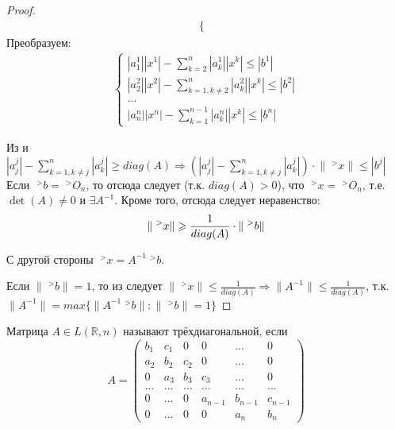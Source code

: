 \documentclass[__main__.tex]{subfiles}
\begin{document}
\begin{proof}
\begin{gather*}
\begin{cases}
        \end{cases}
    \end{gather*}
    Преобразуем:
    \begin{gather*}
        \begin{cases}
            |a^1_1| |x^1| - \sum_{k=2}^{n} |a^1_k| |x^k| \leqslant |b^1|          \\
            |a^2_2| |x^2| - \sum_{k=1,k \neq 2}^{n} |a^2_k| |x^k| \leqslant |b^2| \\
            ...                                                                   \\
            |a^n_n| |x^n| - \sum_{k=1}^{n-1} |a^n_k| |x^k| \leqslant |b^n|
        \end{cases}
    \end{gather*}

    Из  и $|a^j_j| - \sum_{k=1,k\neq j}^{n} |a^j_k| \geqslant diag(A) \Rightarrow (|a^j_j| - \sum_{k=1,k \neq j}^{n} |a^j_k|) \cdot \lVert \;^{>}x \rVert \leqslant |b^j|$
    Если $\;^{>}b = \;^{>}O_n$, то отсюда следует (т.к. $diag(A)>0$), что $\;^{>}x = \;^{>}O_n$, т.е. $\det(A) \neq 0$ и $\exists A^{-1}$. Кроме того, отсюда следует неравенство:
    \begin{equation}
        \llabel{2_4}
        \lVert \;^{>}x \rVert \geqslant \frac{1}{diag(A)} \cdot \lVert \;^{>}b \rVert
    \end{equation}

    С другой стороны $\;^{>}x = A^{-1} \;^{>}b$.

    Если $\lVert \;^{>}b \rVert = 1$, то из  следует $\lVert \;^{>}x \rVert \leqslant \frac{1}{diag(A)} \Rightarrow \lVert A^{-1} \rVert \leqslant \frac{1}{diag(A)}$, т.к. $\lVert A^{-1} \rVert = max \lbrace \lVert A^{-1} \;^{>}b \rVert : \lVert \;^{>}b \rVert = 1 \rbrace$
\end{proof}

\begin{definition}
    Матрица $A \in L (\mathbb{R},n)$ называют трёхдиагональной, если
    $$
        A =
        \left(
        \begin{matrix}
                b_1 & c_1 & 0   & 0       & ...     & 0       \\
                a_2 & b_2 & c_2 & 0       & ...     & 0       \\
                0   & a_3 & b_3 & c_3     & ...     & 0       \\
                ... & ... & ... & ...     & ...     & ...     \\
                0   & ... & 0   & a_{n-1} & b_{n-1} & c_{n-1} \\
                0   & ... & 0   & 0       & a_{n}   & b_{n}
            \end{matrix}
        \right)
    $$
\end{definition}
\end{document}
